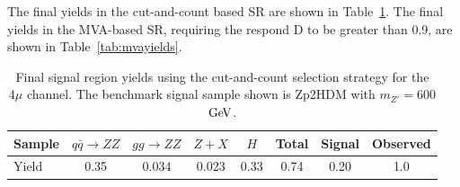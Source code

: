 \begin{table}[htbH]
\begin{center}
\caption{Cutflow table for the $4\mu$ channel. The benchmark signal sample shown is Zp2HDM with $m_{Z'}=600$ $\GeV$.}\label{tab:smyields}
\end{center}
\end{table}

The final yields in the cut-and-count based SR are shown in Table~\ref{tab:cacyields}. 
The final yields in the MVA-based SR, requiring the respond D to be greater than 0.9, are shown in Table~\ref{tab:mvayields}. 


\begin{table}[htbH]
\begin{center}
\begin{tabular}{ l | c | c | c | c | c | c | c }
\hline
Sample & $q\bar{q} \rightarrow ZZ$ & $gg \rightarrow ZZ$ & $Z+X$ & $H$ & Total & Signal & Observed \\
\hline
Yield & 0.35 & 0.034 & 0.023 & 0.33 & 0.74 & 0.20 & 1.0 \\
\hline
\end{tabular}
\caption{Final signal region yields using the cut-and-count selection strategy for the $4\mu$ channel. The benchmark signal sample shown is Zp2HDM with $m_{Z'}=600$ $\GeV$.}\label{tab:cacyields}
\end{center}
\end{table}

